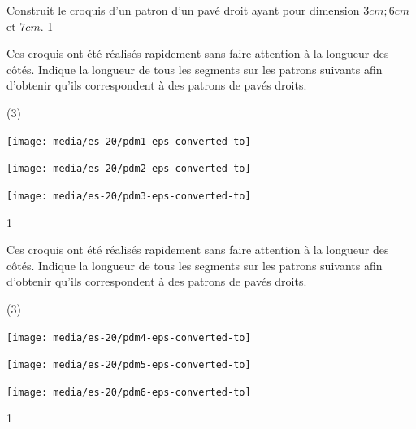 \documentclass[a4paper,11pt]{report}
\begin{document}
\begin{exop}{
Construit le croquis d'un patron d'un pavé droit ayant pour dimension $3cm; 6cm$ et $7cm$.
	}{1}
\end{exop}
\begin{exop}{ Ces croquis ont été réalisés rapidement sans faire attention à la longueur des côtés.
	Indique la longueur de tous les segments sur les patrons suivants afin d'obtenir qu'ils correspondent à des patrons de pavés droits.
\begin{tasks}(3)
		\task 	
		
		\texttt{[image: media/es-20/pdm1-eps-converted-to]}
		\task 

		\texttt{[image: media/es-20/pdm2-eps-converted-to]}
		\task 

		\texttt{[image: media/es-20/pdm3-eps-converted-to]}
\end{tasks}

}{1}
\end{exop}
\begin{exop}{ Ces croquis ont été réalisés rapidement sans faire attention à la longueur des côtés.
	Indique la longueur de tous les segments sur les patrons suivants afin d'obtenir qu'ils correspondent à des patrons de pavés droits.
\begin{tasks}(3)
		\task 	

		\texttt{[image: media/es-20/pdm4-eps-converted-to]}
		\task

		\texttt{[image: media/es-20/pdm5-eps-converted-to]}
		\task 

		\texttt{[image: media/es-20/pdm6-eps-converted-to]}
\end{tasks}

}{1}
\end{exop}
\end{document}
